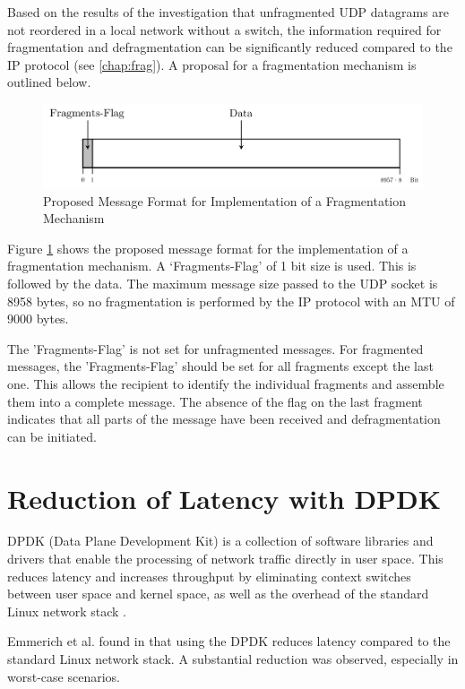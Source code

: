 Based on the results of the investigation that unfragmented UDP datagrams are not reordered in a local network without a switch, the information required for fragmentation and defragmentation can be significantly reduced compared to the IP protocol (see \ref{chap:frag}). A proposal for a fragmentation mechanism is outlined below.

\begin{figure}[h!]
    \centering
    \includegraphics[width=1\linewidth]{figures/outlook/frag_header.pdf}
    \caption{Proposed Message Format for Implementation of a Fragmentation Mechanism}
    \label{fig:FragProposal}
\end{figure}

Figure \ref{fig:FragProposal} shows the proposed message format for the implementation of a fragmentation mechanism. A `Fragments-Flag' of 1 bit size is used. This is followed by the data. The maximum message size passed to the UDP socket is 8958 bytes, so no fragmentation is performed by the IP protocol with an MTU of 9000 bytes.

The 'Fragments-Flag' is not set for unfragmented messages. For fragmented messages, the 'Fragments-Flag' should be set for all fragments except the last one. This allows the recipient to identify the individual fragments and assemble them into a complete message. The absence of the flag on the last fragment indicates that all parts of the message have been received and defragmentation can be initiated.

\section{Reduction of Latency with DPDK}
DPDK (Data Plane Development Kit) is a collection of software libraries and drivers that enable the processing of network traffic directly in user space. This reduces latency and increases throughput by eliminating context switches between user space and kernel space, as well as the overhead of the standard Linux network stack \cite{outl02}.

Emmerich et al. found in \cite{outl01} that using the DPDK reduces latency compared to the standard Linux network stack. A substantial reduction was observed, especially in worst-case scenarios.